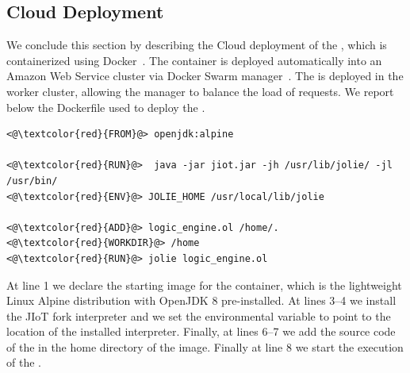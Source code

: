 \subsection{Cloud Deployment}

We conclude this section by describing the Cloud deployment of the
, which is containerized using
Docker~\cite{Merkel:2014:DLL:2600239.2600241}. The container is deployed
automatically into an Amazon Web Service cluster via Docker Swarm
manager~\cite{Soppelsa:2017:NDC:3153103}. The  is deployed in
the worker cluster, allowing the manager to balance the load of requests. We
report below the Dockerfile used to deploy the .
%
\begin{lstlisting}
<@\textcolor{red}{FROM}@> openjdk:alpine

<@\textcolor{red}{RUN}@>  java -jar jiot.jar -jh /usr/lib/jolie/ -jl /usr/bin/
<@\textcolor{red}{ENV}@> JOLIE_HOME /usr/local/lib/jolie

<@\textcolor{red}{ADD}@> logic_engine.ol /home/.
<@\textcolor{red}{WORKDIR}@> /home
<@\textcolor{red}{RUN}@> jolie logic_engine.ol
\end{lstlisting}
%
At line 1 we declare the starting image for the container, which is the
lightweight Linux Alpine distribution with OpenJDK 8 pre-installed. At lines
3--4 we install the JIoT fork interpreter and we set the environmental
variable  to point to the location of the installed interpreter. Finally, at lines 6--7 we add the source code of the
 in the home directory of the image.
Finally at line 8 we start the execution of the .
